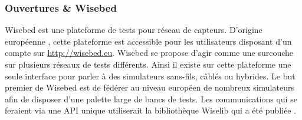 \subsubsection{Ouvertures \& Wisebed}

Wisebed \cite{chatzigiannakis09sensappeal} est une plateforme de tests pour
réseau de capteurs. D'origine européenne \cite{fischer08wisebed}, cette
plateforme est accessible pour les utilisateurs disposant d'un compte sur
\url{http://wisebed.eu}. Wisebed se propose d'agir comme une surcouche sur
plusieurs réseaux de tests différents. Ainsi il existe sur cette plateforme une
seule interface pour parler à des simulateurs sans-fils, câblés ou hybrides. Le
but premier de Wisebed est de fédérer au niveau européen de nombreux
simulateurs afin de disposer d'une palette large de bancs de tests. Les
communications qui se feraient via une API unique utiliserait la bibliothèque
Wiselib qui a été publiée \cite{DBLP:journals/corr/abs-1101-3067}.

